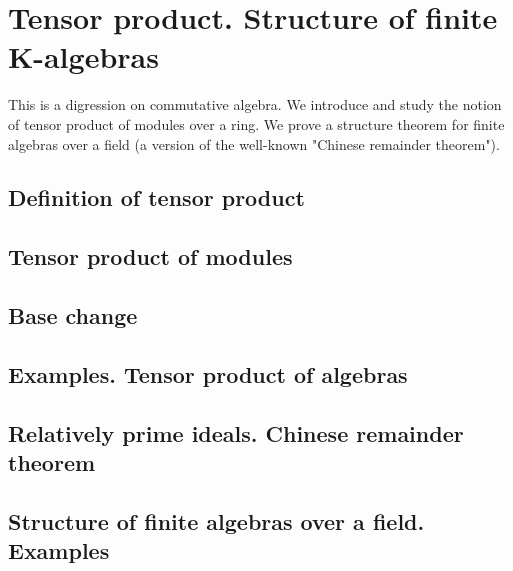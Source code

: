 \chapter{Tensor product. Structure of finite K-algebras}
This is a digression on commutative algebra. We introduce and study
the notion of tensor product of modules over a ring. We prove a
structure theorem for finite algebras over a field (a version of the
well-known "Chinese remainder theorem").


\section{Definition of tensor product}

\section{Tensor product of modules}
\section{Base change}
\section{Examples. Tensor product of algebras}
\section{Relatively prime ideals. Chinese remainder theorem}
\section{Structure of finite algebras over a field. Examples}
